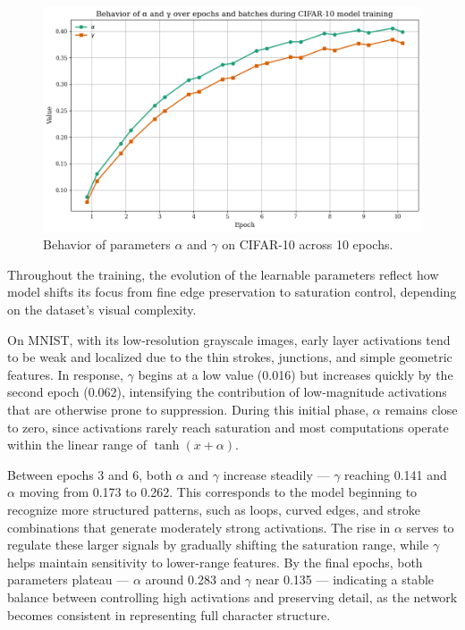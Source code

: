 \documentclass{article}
\begin{document}
\begin{figure}[H]
    \centering
    \includegraphics[width=0.6\linewidth]{cifar_parameter_graph.png}
    \caption{Behavior of parameters $\alpha$ and $\gamma$ on CIFAR-10 across 10 epochs.}
    \label{fig:cifar-parameters}
\end{figure}


\noindent
Throughout the training, the evolution of the learnable parameters reflect how model shifts its focus from fine edge preservation to saturation control, depending on the dataset's visual complexity.


\vspace{4pt}
\noindent
On MNIST, with its low-resolution grayscale images, early layer activations tend to be weak and localized due to the thin strokes, junctions, and simple geometric features. In response, $\gamma$ begins at a low value (0.016) but increases quickly by the second epoch (0.062), intensifying the contribution of low-magnitude activations that are otherwise prone to suppression. During this initial phase, $\alpha$ remains close to zero, since activations rarely reach saturation and most computations operate within the linear range of $\tanh(x + \alpha)$.

\vspace{4pt}

\noindent
Between epochs 3 and 6, both $\alpha$ and $\gamma$ increase steadily --- $\gamma$ reaching 0.141 and $\alpha$ moving from 0.173 to 0.262. This corresponds to the model beginning to recognize more structured patterns, such as loops, curved edges, and stroke combinations that generate moderately strong activations. The rise in $\alpha$ serves to regulate these larger signals by gradually shifting the saturation range, while $\gamma$ helps maintain sensitivity to lower-range features. By the final epochs, both parameters plateau --- $\alpha$ around 0.283 and $\gamma$ near 0.135 --- indicating a stable balance between controlling high activations and preserving detail, as the network becomes consistent in representing full character structure.
\end{document}

